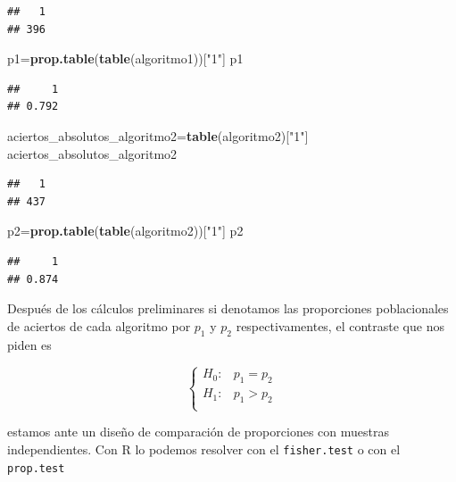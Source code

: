 \documentclass[
]{article}
\newenvironment{Shaded}{\begin{snugshade}}{\end{snugshade}}
\newcommand{\KeywordTok}[1]{\textcolor[rgb]{0.13,0.29,0.53}{\textbf{#1}}}
\newcommand{\NormalTok}[1]{#1}
\newcommand{\StringTok}[1]{\textcolor[rgb]{0.31,0.60,0.02}{#1}}
\begin{document}
\begin{verbatim}
##   1 
## 396
\end{verbatim}

\begin{Shaded}
\begin{Highlighting}[]
\NormalTok{p1=}\KeywordTok{prop.table}\NormalTok{(}\KeywordTok{table}\NormalTok{(algoritmo1))[}\StringTok{"1"}\NormalTok{]}
\NormalTok{p1}
\end{Highlighting}
\end{Shaded}

\begin{verbatim}
##     1 
## 0.792
\end{verbatim}

\begin{Shaded}
\begin{Highlighting}[]
\NormalTok{aciertos\_absolutos\_algoritmo2=}\KeywordTok{table}\NormalTok{(algoritmo2)[}\StringTok{"1"}\NormalTok{]}
\NormalTok{aciertos\_absolutos\_algoritmo2}
\end{Highlighting}
\end{Shaded}

\begin{verbatim}
##   1 
## 437
\end{verbatim}

\begin{Shaded}
\begin{Highlighting}[]
\NormalTok{p2=}\KeywordTok{prop.table}\NormalTok{(}\KeywordTok{table}\NormalTok{(algoritmo2))[}\StringTok{"1"}\NormalTok{]}
\NormalTok{p2}
\end{Highlighting}
\end{Shaded}

\begin{verbatim}
##     1 
## 0.874
\end{verbatim}

Después de los cálculos preliminares si denotamos las proporciones
poblacionales de aciertos de cada algoritmo por \(p_1\) y \(p_2\)
respectivamentes, el contraste que nos piden es

\[
\left\{
\begin{array}{ll}
H_0: & p_1=p_2\\
H_1: & p_1>p_2\\
\end{array}
\right.
\]

estamos ante un diseño de comparación de proporciones con muestras
independientes. Con R lo podemos resolver con el \texttt{fisher.test} o
con el \texttt{prop.test}
\end{document}
